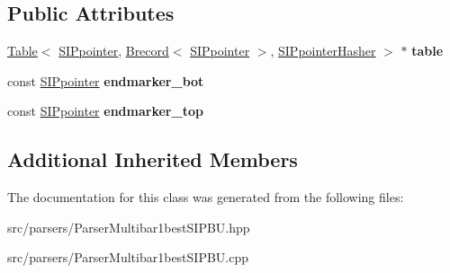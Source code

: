 \subsection*{Public Attributes}
\begin{DoxyCompactItemize}
\item 
\mbox{\label{classParserMultibar1bestSIPBU_ab6d0f29b05a38747a2cbb1bcd820afa2}} 
\mbox{\hyperlink{classTable}{Table}}$<$ \mbox{\hyperlink{classSIPpointer}{S\+I\+Ppointer}}, \mbox{\hyperlink{classBrecord}{Brecord}}$<$ \mbox{\hyperlink{classSIPpointer}{S\+I\+Ppointer}} $>$, \mbox{\hyperlink{structSIPpointerHasher}{S\+I\+Ppointer\+Hasher}} $>$ $\ast$ {\bfseries table}
\item 
\mbox{\label{classParserMultibar1bestSIPBU_a19b92e1e0ad2518f330e98ddd2d44f2c}} 
const \mbox{\hyperlink{classSIPpointer}{S\+I\+Ppointer}} {\bfseries endmarker\+\_\+bot}
\item 
\mbox{\label{classParserMultibar1bestSIPBU_accaeb903b540cde5c4deb362e980becd}} 
const \mbox{\hyperlink{classSIPpointer}{S\+I\+Ppointer}} {\bfseries endmarker\+\_\+top}
\end{DoxyCompactItemize}
\subsection*{Additional Inherited Members}


The documentation for this class was generated from the following files\+:\begin{DoxyCompactItemize}
\item 
src/parsers/Parser\+Multibar1best\+S\+I\+P\+B\+U.\+hpp\item 
src/parsers/Parser\+Multibar1best\+S\+I\+P\+B\+U.\+cpp\end{DoxyCompactItemize}
